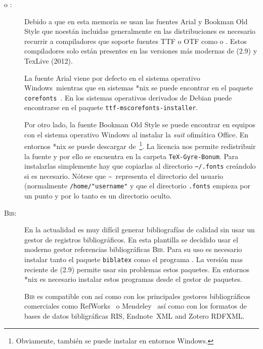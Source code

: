\documentclass{DeustoFDP}
\begin{document}
\begin{description}
  \item[ o :] Debido a que en esta memoria se
    usan las fuentes Arial y Bookman Old Style que noest\'an incluidas generalmente en
    las distribuciones  es necesario recurrir a compiladores que
    soporte fuentes TTF o OTF como  o .
    Estos compiladores solo est\'an presentes en las versiones m\'as modernas de
     (2.9) y TexLive (2012).

    La fuente Arial viene por defecto en el sistema operativo Windows\textregistered\
    mientras que en sistemas *nix se puede encontrar en el paquete
    \texttt{corefonts}~\cite{corefonts}. En los sistemas operativos derivados
    de Debian puede encontrarse en el paquete \texttt{ttf-mscorefonts-installer}.

    Por otro lado, la fuente Bookman Old Style se puede encontrar en equipos con
    el sistema operativo Windows al instalar la \emph{suit} ofim\'atica
    Office\textregistered. En entornos *nix se puede descargar
    de~\cite{fuente}\footnote{Obviamente, tambi\'en se puede instalar
    en entornos Windows\textregistered.}. La licencia nos permite redistribuir
    la fuente y por ello se encuentra en la carpeta \texttt{TeX-Gyre-Bonum}.
    Para instalarlas simplemente hay que copiarlas al directorio
    \verb+~/.fonts+ cre\'andolo si es necesario. N\'otese que \textasciitilde\ representa el
    directorio del usuario (normalmente \verb+/home/"username"+ y que el directorio
    \verb+.fonts+ empieza por un punto y por lo tanto es un directorio oculto.

  \item[\textsc{Bib}:] En la actualidad es muy dif\'icil generar
    bibliograf\'ias de calidad sin usar un gestor de registros bibliogr\'aficos.
    En esta plantilla se decidido usar el moderno gestor referencias
    bibliogr\'aficas \textsc{Bib}\hologo{LaTeX}. Para su uso es necesario instalar
    tanto el paquete \texttt{biblatex} como el programa \hologo{biber}.
    La versi\'on mas reciente de \hologo{MiKTeX} (2.9) permite usar sin problemas
    estos paquetes. En entornos *nix es necesario instalar estos programas desde
    el gestor de paquetes.

    \textsc{Bib} es compatible con  as\'i como con los
    principales gestores bibliogr\'aficos co\-mer\-cia\-les como
    RefWorks\textregistered~\cite{refworks} o
    Mendeley\textregistered~\cite{mendeley} as\'i como con los formatos
    de bases de datos bibligr\'aficas RIS, Endnote\texttrademark\ XML and
    Zotero RDFXML.


\end{description}
\end{document}
